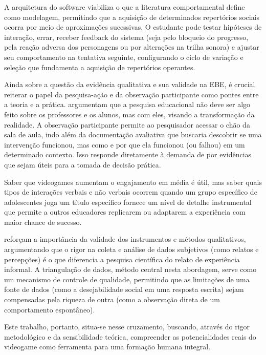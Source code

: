 \documentclass[portuguese]{textolivre}
\begin{document}
A arquitetura do software viabiliza o que a literatura comportamental define como modelagem, permitindo que a aquisição de determinados repertórios sociais ocorra por meio de aproximações sucessivas. O estudante pode testar hipóteses de interação, errar, receber feedback do sistema (seja pelo bloqueio do progresso, pela reação adversa dos personagens ou por alterações na trilha sonora) e ajustar seu comportamento na tentativa seguinte, configurando o ciclo de variação e seleção que fundamenta a aquisição de repertórios operantes.

Ainda sobre a questão da evidência qualitativa e sua validade na EBE, é crucial reiterar o papel da pesquisa-ação e da observação participante como pontes entre a teoria e a prática. \textcite{tripp2005pesquisa,kemmis1988action} argumentam que a pesquisa educacional não deve ser algo feito sobre os professores e os alunos, mas com eles, visando a transformação da realidade. A observação participante \cite{marques2016observacao} permite ao pesquisador acessar o chão da sala de aula, indo além da documentação avaliativa que buscaria descobrir se uma intervenção funcionou, mas como e por que ela funcionou (ou falhou) em um determinado contexto. Isso responde diretamente à demanda de \textcite{davies1999evidence} por evidências que sejam úteis para a tomada de decisão prática.

Saber que videogames aumentam o engajamento em média é útil, mas saber quais tipos de interações verbais e não verbais ocorrem quando um grupo específico de adolescentes joga um título específico fornece um nível de detalhe instrumental que permite a outros educadores replicarem ou adaptarem a experiência com maior chance de sucesso.

\textcite{costa2024likert} reforçam a importância da validade dos instrumentos e métodos qualitativos, argumentando que o rigor na coleta e análise de dados subjetivos (como relatos e percepções) é o que diferencia a pesquisa científica do relato de experiência informal. A triangulação de dados, método central nesta abordagem, serve como um mecanismo de controle de qualidade, permitindo que as limitações de uma fonte de dados (como a desejabilidade social em uma resposta escrita) sejam compensadas pela riqueza de outra (como a observação direta de um comportamento espontâneo).

Este trabalho, portanto, situa-se nesse cruzamento, buscando, através do rigor metodológico e da sensibilidade teórica, compreender as potencialidades reais do videogame como ferramenta para uma formação humana integral.
\end{document}
